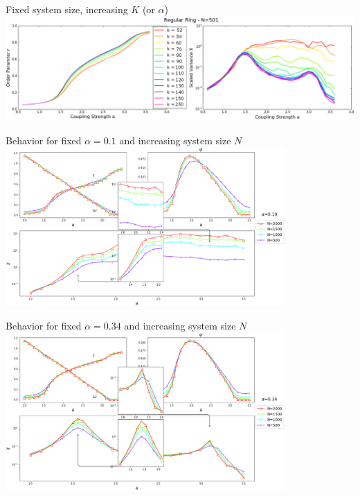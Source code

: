 \documentclass[serif,mathserif]{beamer}
\begin{document}
\begin{frame}
    \centering
    Fixed system size, increasing $K$ (or $\alpha$)\\
    \vspace{0.25cm}
    \includegraphics[width=\textwidth]{./ringOP.eps}
\end{frame}

\begin{frame}
    \centering
    Behavior for fixed $\alpha=0.1$ and increasing system size $N$\\
    \vspace{0.25cm}
    \includegraphics[width=0.8\textwidth]{./increasingN-alpha10.eps}
\end{frame}

\begin{frame}
    \centering
    Behavior for fixed $\alpha=0.34$ and increasing system size $N$\\
    \vspace{0.25cm}
    \includegraphics[width=0.8\textwidth]{./increasingN-alpha34.eps}
\end{frame}
\end{document}
